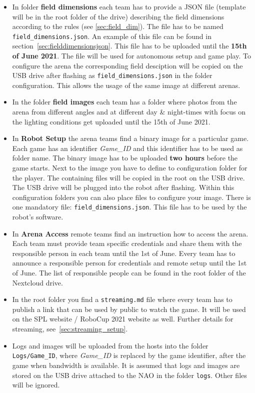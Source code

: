 \begin{itemize}
    \item In folder \textbf{field dimensions} each team has to provide a JSON file (template will be in the root folder of the drive) describing the field dimensions according to the rules (see \ref{sec:field_dim}). The file has to be named \texttt{field\_dimensions.json}. An example of this file can be found in section~\ref{sec:fielddimensionsjson}. This file has to be uploaded until the \textbf{15th of June 2021}. The file will be used for autonomous setup and game play. To configure the arena the corresponding field desciption will be copied on the USB drive after flashing as \texttt{field\_dimensions.json} in the folder configuration. This allows the usage of the same image at different arenas.
    \item In the folder \textbf{field images} each team has a folder where photos from the arena from different angles and at different day \& night-times with focus on the lighting conditions get uploaded until the 15th of June 2021.
    \item In \textbf{Robot Setup} the arena teams find a binary image for a particular game. Each game has an identifier \textit{Game\_ID} and this identifier has to be used as folder name. The binary image has to be uploaded \textbf{two hours} before the game starts. Next to the image you have to define to configuration folder for the player. The containing files will be copied in the root on the USB drive. The USB drive will be plugged into the robot after flashing. Within this configuration folders you can also place files to configure your image. There is one mandatory file: \texttt{field\_dimensions.json}. This file has to be used by the robot's software.
    \item In \textbf{Arena Access} remote teams find an instruction how to access the arena. Each team must provide team specific credentials and share them with the responsible person in each team until the 1st of June. Every team has to announce a responsible person for credentials and remote setup until the 1st of June. The list of responsible people can be found in the root folder of the Nextcloud drive.
    \item In the root folder you find a \texttt{streaming.md} file where every team has to publish a link that can be used by public to watch the game. It will be used on the SPL website / RoboCup 2021 website as well. Further details for streaming, see~\ref{sec:streaming_setup}.
	\item Logs and images will be uploaded from the hosts into the folder \texttt{Logs/Game\_ID}, where \textit{Game\_ID} is replaced by the game identifier, after the game when bandwidth is available. It is assumed that logs and images are stored on the USB drive attached to the NAO in the folder \texttt{logs}. Other files will be ignored. 

\end{itemize}

